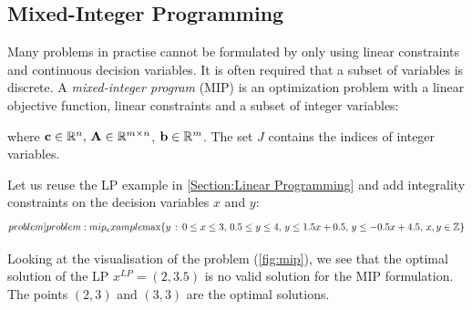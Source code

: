 
\subsection{Mixed-Integer Programming} \label{Section:MIP}
Many problems in practise cannot be formulated by only using linear constraints and continuous decision variables. It is often required that a subset of variables is discrete. A \textit{mixed-integer program} (MIP) is an optimization problem with a linear objective function, linear constraints and a subset of integer variables:


where $\bold c \in \mathbb{R}^n, \, \bold A \in \mathbb{R}^{m \times n}$, $\bold b \in \mathbb{R}^m$. The set $J$ contains the indices of integer variables. 

Let us reuse the LP example in \cref{Section:Linear Programming} and add integrality constraints on the decision variables $x$ and $y$:
\begin{equation} \label[problem]{problem:mip_example}
    \text{max} \{y \, : \, 0 \leq x \leq 3 , \, 0.5 \leq y \leq 4, \, y \leq 1.5 x + 0.5, \, y \leq -0.5 x + 4.5, \, x,y \in \mathbb{Z} \}
\end{equation} 

Looking at the visualisation of the problem (\cref{fig:mip}), we see that the optimal solution of the LP $x^{LP} = (2,3.5)$ is no valid solution for the MIP formulation. The points $(2,3)$ and $(3,3)$ are the optimal solutions.

